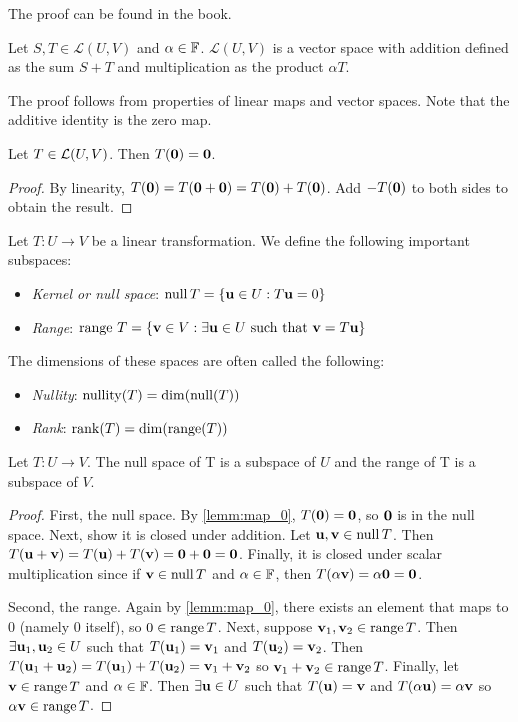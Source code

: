 \documentclass{article}
\begin{document}
The proof can be found in the book.

\begin{theorem}
Let $S,T \in \mathcal{L}(U,V)$ and $\alpha \in {\mathbb{F}}$. $\mathcal{L}(U,V)$ is a vector space with addition defined as the sum $S+T$ and multiplication as the product $\alpha T$.
\end{theorem}

The proof follows from properties of linear maps and vector spaces. Note that the additive identity is the zero map.


\begin{lemma}
\label{lemm:map_0}
Let $T \in {\mathcal{L}}(U,V)$. Then $T({\mathbf{0}}) = {\mathbf{0}}$.
\end{lemma}
\begin{proof}
By linearity, $T({\mathbf{0}}) = T({\mathbf{0}}+{\mathbf{0}}) = T({\mathbf{0}}) + T({\mathbf{0}})$. Add $-T({\mathbf{0}})$ to both sides to obtain the result.
\end{proof}

\begin{definition}
Let $T:U \to V$ be a linear transformation. We define the following important subspaces:
\begin{itemize}
\item \emph{Kernel or null space}: $\operatorname{null} T = \{{\mathbf{u}} \in U : T{\mathbf{u}} = 0 \}$
\item \emph{Range}: $\operatorname{range} \, T = \{{\mathbf{v}} \in V : \exists {\mathbf{u}} \in U \text{ such that } {\mathbf{v}} = T {\mathbf{u}} \}$
\end{itemize}
The dimensions of these spaces are often called the following:
\begin{itemize}
\item \emph{Nullity}: $\operatorname{nullity}(T) = \dim(\operatorname{null}(T))$
\item \emph{Rank}: $\operatorname{rank}(T) = \dim(\operatorname{range}(T))$
\end{itemize}
\end{definition}


\begin{proposition}
Let $T: U \to V$. The null space of T is a subspace of $U$ and the range of T is a subspace of $V$.
\end{proposition}
\begin{proof}
First, the null space. By \cref{lemm:map_0}, $T({\mathbf{0}}) = {\mathbf{0}}$, so ${\mathbf{0}}$ is in the null space. Next, show it is closed under addition. Let ${\mathbf{u}},{\mathbf{v}} \in \operatorname{null} T$. Then $T({\mathbf{u}} + {\mathbf{v}}) = T({\mathbf{u}}) + T({\mathbf{v}}) = {\mathbf{0}}+{\mathbf{0}} = {\mathbf{0}}$. Finally, it is closed under scalar multiplication since if ${\mathbf{v}} \in \operatorname{null} T$ and $\alpha \in {\mathbb{F}}$, then $T(\alpha {\mathbf{v}}) = \alpha {\mathbf{0}} = {\mathbf{0}}$.

Second, the range. Again by \cref{lemm:map_0}, there exists an element that maps to 0 (namely 0 itself), so $0 \in \operatorname{range} T$. Next, suppose ${\mathbf{v}}_1,{\mathbf{v}}_2 \in \operatorname{range} T$. Then $\exists {\mathbf{u}}_1, {\mathbf{u}}_2 \in U$ such that $T({\mathbf{u}}_1) = {\mathbf{v}}_1$ and $T({\mathbf{u}}_2) = {\mathbf{v}}_2$. Then $T({\mathbf{u}}_1 + {\mathbf{u}}_2) = T({\mathbf{u}}_1) + T({\mathbf{u}}_2) = {\mathbf{v}}_1 + {\mathbf{v}}_2$ so ${\mathbf{v}}_1 + {\mathbf{v}}_2 \in \operatorname{range} T$. Finally, let ${\mathbf{v}} \in \operatorname{range} T$ and $\alpha \in {\mathbb{F}}$. Then $\exists {\mathbf{u}} \in U$ such that $T({\mathbf{u}}) = {\mathbf{v}}$ and $T(\alpha {\mathbf{u}}) = \alpha {\mathbf{v}}$ so $\alpha {\mathbf{v}} \in \operatorname{range} T$. 
\end{proof}
\end{document}
